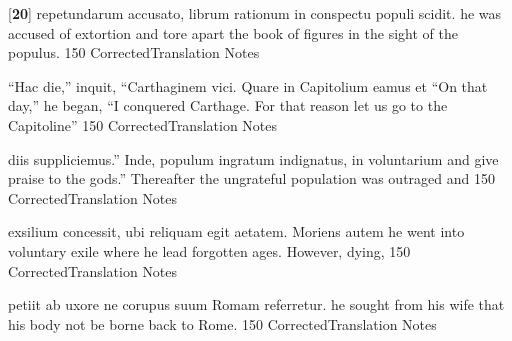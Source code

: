 \latline
  {[\textbf{20}] repetundarum accusato, librum rationum in conspectu populi scidit.}
  { he was accused of extortion and tore apart the book of figures in the sight of the populus. }
  {150}
  { CorrectedTranslation }
  { Notes }


\latline
  {``Hac die,'' inquit, ``Carthaginem vici.  Quare in Capitolium eamus et}
  { ``On that day,'' he began, ``I conquered Carthage.  For that reason let us go to the Capitoline'' }
  {150}
  { CorrectedTranslation }
  { Notes }


\latline
  {diis suppliciemus.''  Inde, populum ingratum indignatus, in voluntarium}
  { and give praise to the gods.''  Thereafter the ungrateful population was outraged and }
  {150}
  { CorrectedTranslation }
  { Notes }


\latline
  {exsilium concessit, ubi reliquam egit aetatem.  Moriens autem}
  { he went into voluntary exile where he lead forgotten ages.  However, dying, }
  {150}
  { CorrectedTranslation }
  { Notes }


\latline
  {petiit ab uxore ne corupus suum Romam referretur.}
  { he sought from his wife that his body not be borne back to Rome. }
  {150}
  { CorrectedTranslation }
  { Notes }


